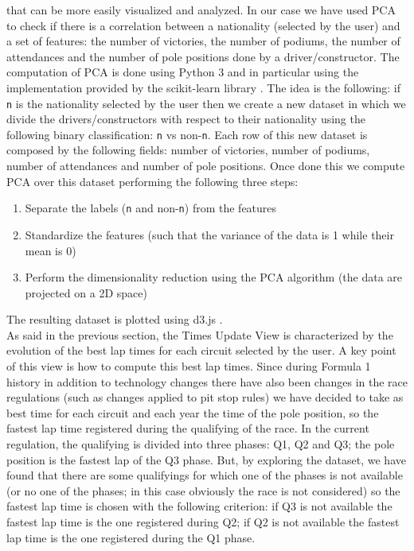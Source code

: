 \documentclass[10pt,twocolumn,letterpaper]{article}
\begin{document}
that can be more easily visualized and analyzed. In our case we have used PCA to check if there is a correlation between a nationality (selected by the user) and a set of features:
the number of victories, the number of podiums, the number of attendances and the number of pole positions done by a driver/constructor. The computation of PCA is done using Python 3 
and in particular using the implementation provided by the scikit-learn library \cite{Scikit-learn}. The idea is the following: if \texttt{n} is the nationality selected by the user 
then we create a new dataset in which we divide the drivers/constructors with respect to their nationality using the following binary classification: \texttt{n} vs non-\texttt{n}. 
Each row of this new dataset is composed by the following fields: number of victories, number of podiums, number of attendances and number of pole positions. Once done this we compute
PCA over this dataset performing the following three steps:
\begin{enumerate}
	\item Separate the labels (\texttt{n} and non-\texttt{n}) from the features
	\item Standardize the features (such that the variance of the data is 1 while their mean is 0)
	\item Perform the dimensionality reduction using the PCA algorithm (the data are projected on a 2D space)
\end{enumerate}
The resulting dataset is plotted using d3.js \cite{D3}.\\
As said in the previous section, the Times Update View is characterized by the evolution of the best lap times for each circuit selected by the user. A key point of this view is how to 
compute this best lap times. Since during Formula 1 history in addition to technology changes there have also been changes in the race regulations (such as changes applied to pit stop
rules) we have decided to take as best time for each circuit and each year the time of the pole position, so the fastest lap time registered during the qualifying of the race.
In the current regulation, the qualifying is divided into three phases: Q1, Q2 and Q3; the pole position is the fastest lap of the Q3 phase. But, by exploring the dataset, we have found
that there are some qualifyings for which one of the phases is not available (or no one of the phases; in this case obviously the race is not considered) so the fastest lap time is chosen
with the following criterion: if Q3 is not available the fastest lap time is the one registered during Q2; if Q2 is not available the fastest lap time is the one registered during
the Q1 phase.
\end{document}
